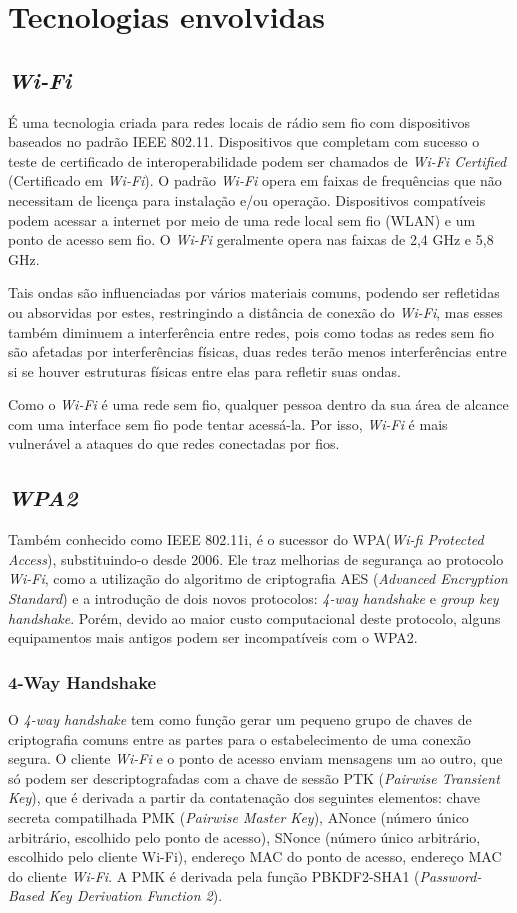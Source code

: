 \documentclass[12pt]{article}
\begin{document}
\section{Tecnologias envolvidas}
\subsection{\textit{Wi-Fi}}
É uma tecnologia criada para redes locais de rádio sem fio com dispositivos baseados no padrão IEEE 802.11. Dispositivos que completam com sucesso o teste de certificado de interoperabilidade podem ser chamados de \textit{Wi-Fi Certified} (Certificado em \textit{Wi-Fi}). O padrão \textit{Wi-Fi} opera em faixas de frequências que não necessitam de licença para instalação e/ou operação. Dispositivos compatíveis podem acessar a internet por meio de uma rede local sem fio (WLAN) e um ponto de acesso sem fio. O \textit{Wi-Fi} geralmente opera nas faixas de 2,4 GHz e 5,8 GHz.

Tais ondas são influenciadas por vários materiais comuns, podendo ser refletidas ou absorvidas por estes, restringindo a distância de conexão do \textit{Wi-Fi}, mas esses também diminuem a interferência entre redes, pois como todas as redes sem fio são afetadas por interferências físicas, duas redes terão menos interferências entre si se houver estruturas físicas entre elas para refletir suas ondas.

Como o \textit{Wi-Fi} é uma rede sem fio, qualquer pessoa dentro da sua área de alcance com uma interface sem fio pode tentar acessá-la. Por isso, \textit{Wi-Fi} é mais vulnerável a ataques do que redes conectadas por fios.
\subsection{\textit{WPA2}}
Também conhecido como IEEE 802.11i, é o sucessor do WPA(\textit{Wi-fi Protected Access}), substituindo-o desde 2006. Ele traz melhorias de segurança ao protocolo \textit{Wi-Fi}, como a utilização do algoritmo de criptografia AES (\textit{Advanced Encryption Standard}) e a introdução de dois novos protocolos: \textit{4-way handshake} e \textit{group key handshake}. Porém, devido ao maior custo computacional deste protocolo, alguns equipamentos mais antigos podem ser incompatíveis com o WPA2.
\subsubsection{4-Way Handshake}
O \textit{4-way handshake} tem como função gerar um pequeno grupo de chaves de criptografia comuns entre as partes para o estabelecimento de uma conexão segura. O cliente \textit{Wi-Fi} e o ponto de acesso enviam mensagens um ao outro, que só podem ser descriptografadas com a chave de sessão PTK (\textit{Pairwise Transient Key}), que é derivada a partir da contatenação dos seguintes elementos: chave secreta compatilhada PMK (\textit{Pairwise Master Key}), ANonce (número único arbitrário, escolhido pelo ponto de acesso), SNonce (número único arbitrário, escolhido pelo cliente Wi-Fi), endereço MAC do ponto de acesso, endereço MAC do cliente \textit{Wi-Fi}. A PMK é derivada pela função PBKDF2-SHA1 (\textit{Password-Based Key Derivation Function 2}).
\end{document}
